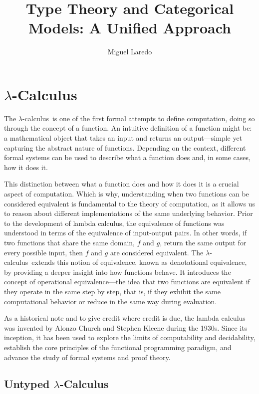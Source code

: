 \documentclass[12pt]{book}
\title{Type Theory and Categorical Models: A Unified Approach}
\author{Miguel Laredo}
\newcommand{\lCalc}{$\lambda$-Calculus}
\newcommand{\lcalc}{$\lambda$-calculus}
\theoremstyle{plain}
\theoremstyle{definition}
\theoremstyle{definition}
\theoremstyle{remark}
\begin{document}
\maketitle
\tableofcontents


\chapter{\lCalc}



The \lcalc \ is one of the first formal attempts to define computation, doing so through the concept of a function. An intuitive definition of a function might be: a mathematical object that takes an input and returns an output—simple yet capturing the abstract nature of functions. Depending on the context, different formal systems can be used to describe what a function does and, in some cases, how it does it.

This distinction between what a function does and how it does it is a crucial aspect of computation. Which is why, understanding when two functions can be considered equivalent is fundamental to the theory of computation, as it allows us to reason about different implementations of the same underlying behavior. Prior to the development of lambda calculus, the equivalence of functions was understood in terms of the equivalence of input-output pairs. In other words, if two functions that share the same domain, $f$ and $g$, return the same output for every possible input, then $f$ and $g$ are considered equivalent. The \lcalc \ extends this notion of equivalence, known as denotational equivalence, by providing a deeper insight into how functions behave. It introduces the concept of operational equivalence—the idea that two functions are equivalent if they operate in the same step by step, that is, if they exhibit the same computational behavior or reduce in the same way during evaluation.

As a historical note and to give credit where credit is due, the lambda calculus was invented by Alonzo Church and Stephen Kleene during the 1930s. Since its inception, it has been used to explore the limits of computability and decidability, establish the core principles of the functional programming paradigm, and advance the study of formal systems and proof theory.

\section{\centering Untyped \lCalc}
\end{document}
